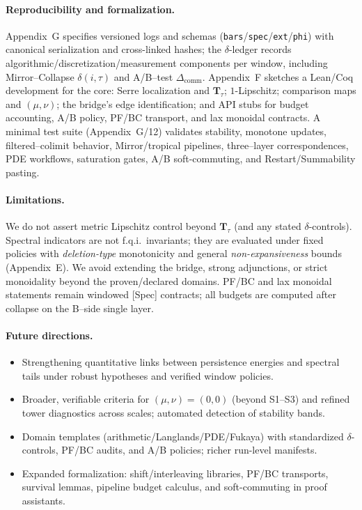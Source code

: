 \documentclass[11pt]{article}
\DeclareRobustCommand{\hyp}{\nobreakdash-}
\numberwithin{equation}{section}
\theoremstyle{definition}
\begin{document}
\paragraph{Reproducibility and formalization.}
Appendix~G specifies versioned logs and schemas (\texttt{bars}/\texttt{spec}/\texttt{ext}/\texttt{phi}) with canonical serialization and cross\hyp linked hashes; the \(\delta\)\hyp ledger records algorithmic/discretization/measurement components per window, including Mirror–Collapse \(\delta(i,\tau)\) and A/B–test \(\Delta_{\mathrm{comm}}\).
Appendix~F sketches a Lean/Coq development for the core: Serre localization and \(\mathbf{T}_\tau\); \(1\)\hyp Lipschitz; comparison maps and \((\mu,\nu)\); the bridge’s edge identification; and API stubs for budget accounting, A/B policy, PF/BC transport, and lax monoidal contracts.
A minimal test suite (Appendix~G/12) validates stability, monotone updates, filtered–colimit behavior, Mirror/tropical pipelines, three–layer correspondences, PDE workflows, saturation gates, A/B soft\hyp commuting, and Restart/Summability pasting.

\paragraph{Limitations.}
We do not assert metric Lipschitz control beyond \(\mathbf{T}_\tau\) (and any stated \(\delta\)\hyp controls).
Spectral indicators are not f.q.i.\ invariants; they are evaluated under fixed policies with \emph{deletion\hyp type} monotonicity and general \emph{non\hyp expansiveness} bounds (Appendix~E).
We avoid extending the bridge, strong adjunctions, or strict monoidality beyond the proven/declared domains.
PF/BC and lax monoidal statements remain windowed [Spec] contracts; all budgets are computed after collapse on the B–side single layer.

\paragraph{Future directions.}
\begin{itemize}
  \item Strengthening quantitative links between persistence energies and spectral tails under robust hypotheses and verified window policies.
  \item Broader, verifiable criteria for \((\mu,\nu)=(0,0)\) (beyond S1–S3) and refined tower diagnostics across scales; automated detection of stability bands.
  \item Domain templates (arithmetic/Langlands/PDE/Fukaya) with standardized \(\delta\)\hyp controls, PF/BC audits, and A/B policies; richer run\hyp level manifests.
  \item Expanded formalization: shift/interleaving libraries, PF/BC transports, survival lemmas, pipeline budget calculus, and soft\hyp commuting in proof assistants.
\end{itemize}
\end{document}
